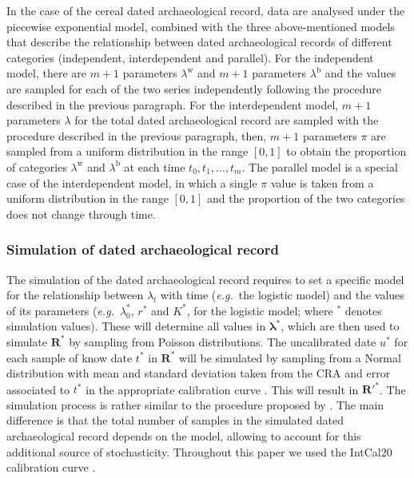 \documentclass[a4paper]{article}
\begin{document}
In the case of the cereal dated archaeological record, data are analysed under the piecewise exponential model, combined with the three above-mentioned models that describe the relationship between dated archaeological records of different categories (independent, interdependent and parallel). For the independent model, there are $m+1$ parameters $\lambda^\mathrm{w}$ and $m+1$ parameters $\lambda^\mathrm{b}$ and the values are sampled for each of the two series independently following the procedure described in the previous paragraph. For the interdependent model, $m+1$ parameters $\lambda$ for the total dated archaeological record are sampled with the procedure described in the previous paragraph, then, $m+1$ parameters $\pi$ are sampled from a uniform distribution in the range $[0,1]$ to obtain the proportion of categories $\lambda^\mathrm{w}$ and $\lambda^\mathrm{b}$ at each time $t_0, t_1, \dots , t_{m}$. The parallel model is a special case of the interdependent model, in which a single $\pi$ value is taken from a uniform distribution in the range $[0,1]$ and the proportion of the two categories does not change through time.
\\


\subsubsection*{Simulation of dated archaeological record}

The simulation of the dated archaeological record requires to set a specific model for the relationship between $\lambda_t$ with time (\emph{e.g.}\ the logistic model) and the values of its parameters (\emph{e.g.}\ $\lambda_0^*$, $r^*$ and $K^*$, for the logistic model; where $^*$ denotes simulation values). These will determine all values in $\bm{\lambda}^*$, which are then used to simulate $\bm{R}^*$ by sampling from Poisson distributions. The uncalibrated date $u^*$ for each sample of know date $t^*$ in $\bm{R}^*$ will be simulated by sampling from a Normal distribution with mean and standard deviation taken from the CRA and error associated to $t^*$ in the appropriate calibration curve \parencite{Shennan2013}. This will result in $\bm{R}'^*$. The simulation process is rather similar to the procedure proposed by \textcite{Shennan2013}. The main difference is that the total number of samples in the simulated dated archaeological record depends on the model, allowing to account for this additional source of stochasticity. Throughout this paper we used the IntCal20 calibration curve \parencite{Reimer2020}.
\\
\end{document}
